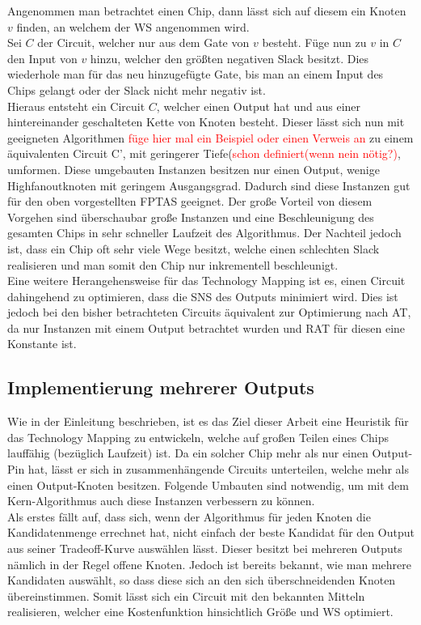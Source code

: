 \documentclass[11pt, a4paper, german]{article}
\newcommand{\TM}{Technology  Mapping }
\begin{document}
Angenommen man betrachtet einen Chip, dann lässt sich auf diesem ein Knoten $v$ finden, an welchem der WS angenommen wird.\\
Sei $C$ der Circuit, welcher nur aus dem Gate von $v$ besteht. Füge nun zu $v$ in $C$ den Input von $v$ hinzu, welcher den größten negativen Slack besitzt. Dies wiederhole man für das neu hinzugefügte Gate, bis man an einem Input des Chips gelangt oder der Slack nicht mehr negativ ist. \\
Hieraus entsteht ein Circuit $C$, welcher einen Output hat und aus einer hintereinander geschalteten Kette von Knoten besteht. Dieser lässt sich nun mit geeigneten Algorithmen \textcolor{red}{füge hier mal ein Beispiel oder einen Verweis an} zu einem äquivalenten Circuit C', mit geringerer Tiefe(\textcolor{red}{schon definiert(wenn nein nötig?)}, umformen. Diese umgebauten Instanzen besitzen nur einen Output, wenige Highfanoutknoten mit geringem Ausgangsgrad. Dadurch sind diese Instanzen gut für den oben vorgestellten FPTAS geeignet. Der große Vorteil von diesem Vorgehen sind überschaubar große Instanzen und eine Beschleunigung des gesamten Chips in sehr schneller Laufzeit des Algorithmus. Der Nachteil jedoch ist, dass ein Chip oft sehr viele Wege besitzt, welche einen schlechten Slack realisieren und man somit den Chip nur inkrementell beschleunigt.\\

Eine weitere Herangehensweise für das \TM ist es, einen Circuit dahingehend zu optimieren, dass die SNS des Outputs minimiert wird. Dies ist jedoch bei den bisher betrachteten Circuits äquivalent zur Optimierung nach AT, da nur Instanzen mit einem Output betrachtet wurden und RAT für diesen eine Konstante ist.

\subsection{Implementierung mehrerer Outputs}
\label{subsec:mehrere_outputs}
Wie in der Einleitung beschrieben, ist es das Ziel dieser Arbeit eine Heuristik für das \TM zu entwickeln, welche auf großen Teilen eines Chips lauffähig (bezüglich Laufzeit) ist. Da ein solcher Chip mehr als nur einen Output-Pin hat, lässt er sich in zusammenhängende Circuits unterteilen, welche mehr als einen Output-Knoten besitzen. Folgende Umbauten sind notwendig, um mit dem Kern-Algorithmus auch diese Instanzen verbessern zu können.\\

Als erstes fällt auf, dass sich, wenn der Algorithmus für jeden Knoten die Kandidatenmenge errechnet hat, nicht einfach der beste Kandidat für den Output aus seiner Tradeoff-Kurve auswählen lässt. Dieser besitzt bei mehreren Outputs nämlich in der Regel offene Knoten. 
Jedoch ist bereits bekannt, wie man mehrere Kandidaten auswählt, so dass diese sich an den sich überschneidenden Knoten übereinstimmen. Somit lässt sich ein Circuit mit den bekannten Mitteln realisieren, welcher eine Kostenfunktion hinsichtlich Größe und WS optimiert. \\
\end{document}
